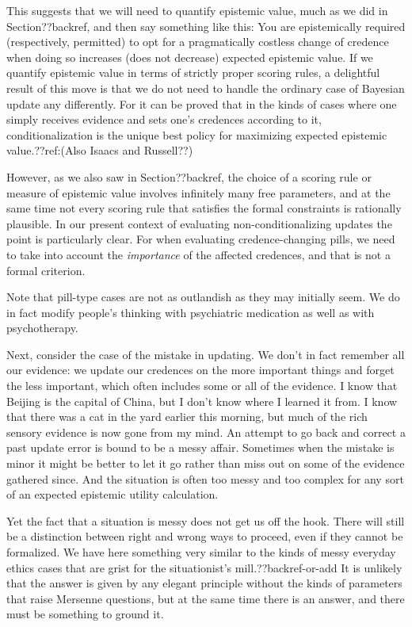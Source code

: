 This suggests that we will need to quantify epistemic value, much as we did in Section??backref, and then say
something like this: You are epistemically required (respectively, permitted) to opt for a pragmatically costless change of 
credence when doing so increases (does not decrease) expected epistemic value. If we quantify epistemic value in terms of
strictly proper scoring rules, a delightful result of this move is that we do not need to handle the ordinary case of 
Bayesian update any differently. For it can be proved that in the kinds of cases where one simply receives
evidence and sets one's credences according to it, conditionalization is the unique best policy for maximizing expected
epistemic value.??ref:(Also Isaacs and Russell??) 

However, as we also saw in Section??backref, the choice of a scoring rule or measure of epistemic value involves infinitely
many free parameters, and at the same time not every scoring rule that satisfies the formal constraints is rationally
plausible. In our present context of evaluating non-conditionalizing updates the point is particularly clear. For when
evaluating credence-changing pills, we need to take into account the \textit{importance} of the affected credences, and
that is not a formal criterion. 

Note that pill-type cases are not as outlandish as they may initially seem. We do in fact modify people's thinking with
psychiatric medication as well as with psychotherapy.

Next, consider the case of the mistake in updating. We don't in fact remember all our evidence:
we update our credences on the more important things and forget the less important, which often includes some or
all of the evidence. I know that Beijing is the capital of China, but I don't know where I learned it from. I know that 
there was a cat in the yard earlier this morning, but much of the rich sensory evidence is now gone from my mind. 
An attempt to go back and correct a past update error is bound to be a messy affair. Sometimes when the mistake is minor
it might be better to let it go rather than miss out on some of the evidence gathered since. And the situation is often
too messy and too complex for any sort of an expected epistemic utility calculation. 

Yet the fact that a situation is messy does not get us off the hook. There will still
be a distinction between right and wrong ways to proceed, even if they cannot be formalized. We have here something very
similar to the kinds of messy everyday ethics cases that are grist for the situationist's mill.??backref-or-add 
It is unlikely that the answer is given by any elegant principle without the kinds of parameters that raise Mersenne
questions, but at the same time there is an answer, and there
must be something to ground it.

